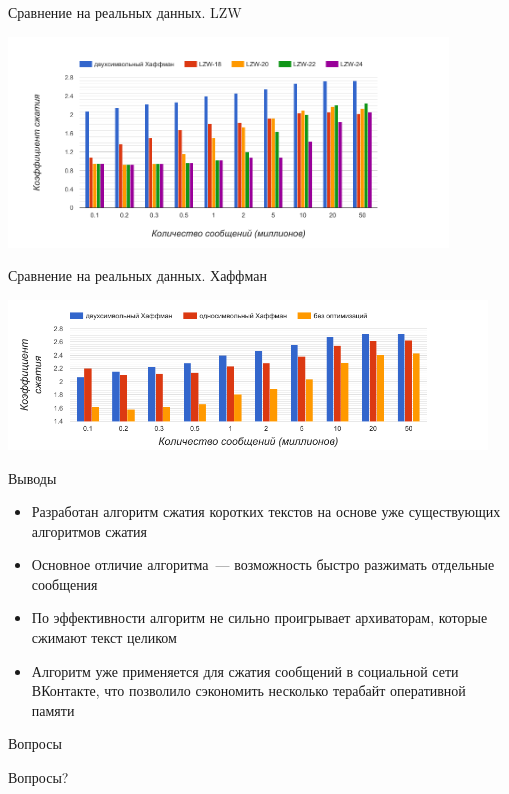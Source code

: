 \documentclass[t,13pt,graphics=pdflatex,xcolor=table,aspectratio=43]{beamer}
\begin{document}
\begin{frame}{Сравнение на реальных данных. LZW}
\begin{center}
\includegraphics[height=2.2in]{pics/lzw.png}
\end{center}
\end{frame}


\begin{frame}{Сравнение на реальных данных. Хаффман}
\begin{center}
\includegraphics[width=5in]{pics/compare.png}
\end{center}
\end{frame}



\begin{frame}{Выводы}    
\begin{itemize}
    \item Разработан алгоритм сжатия коротких текстов на основе уже существующих алгоритмов сжатия
    \item Основное отличие алгоритма~--- возможность быстро разжимать отдельные сообщения
    \item По эффективности алгоритм не сильно проигрывает архиваторам, которые сжимают текст целиком
    \item Алгоритм уже применяется для сжатия сообщений в социальной сети ВКонтакте, что позволило сэкономить несколько терабайт оперативной памяти
\end{itemize}
\end{frame}

\begin{frame}[plain, c]{Вопросы}    
\begin{center}
\Huge Вопросы?
\end{center}
\end{frame}
\end{document}
